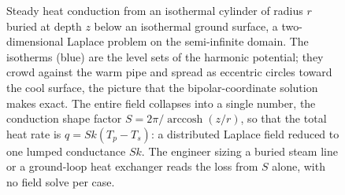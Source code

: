 \begin{figure}[htbp]
\centering
{}
\caption[Conduction shape factor for a buried cylinder]{Steady heat
conduction from an isothermal cylinder of radius $r$ buried at depth
$z$ below an isothermal ground surface, a two-dimensional Laplace
problem on the semi-infinite domain. The isotherms (blue) are the
level sets of the harmonic potential; they crowd against the warm pipe
and spread as eccentric circles toward the cool surface, the picture
that the bipolar-coordinate solution makes exact. The entire field
collapses into a single number, the conduction shape factor
$S = 2\pi/\operatorname{arccosh}(z/r)$, so that the total heat rate is
$q = S k (T_{p} - T_{s})$: a distributed Laplace field reduced to one
lumped conductance $Sk$. The engineer sizing a buried steam line or a
ground-loop heat exchanger reads the loss from $S$ alone, with no
field solve per case.}
\label{fig:vol02:ch12:shape-factor}
\end{figure}
